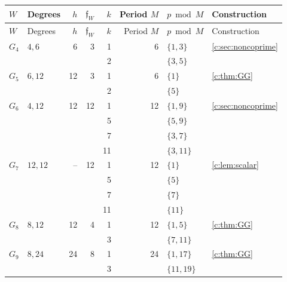 \documentclass[11pt]{amsart}
\theoremstyle{definition}
\begin{document}
\clearpage
\begingroup\small%
\begingroup\setlength{\tabcolsep}{3pt}
\begin{longtable}{@{}lL{.24\textwidth}rrrrL{.26\textwidth}L{.14\textwidth}@{}}
\toprule $W$ & Degrees & $h$ & $\mathfrak f_W$ & $k$ & Period $M$ & $p\bmod M$ & Construction\\\midrule
\endfirsthead
\toprule $W$ & Degrees & $h$ & $\mathfrak f_W$ & $k$ & Period $M$ & $p\bmod M$ & Construction\\\midrule
\endhead
\bottomrule\endfoot
\endlastfoot
$G_{4}$ & $4,\allowbreak 6$ & 6 & 3 & 1 & 6 & $\{1,\allowbreak 3\}$ & \cref{c:sec:noncoprime} \\*
 &  &  &  & 2 &  & $\{3,\allowbreak 5\}$ &  \\
\midrule[.25pt]
$G_{5}$ & $6,\allowbreak 12$ & 12 & 3 & 1 & 6 & $\{1\}$ & \cref{c:thm:GG} \\*
 &  &  &  & 2 &  & $\{5\}$ &  \\
\midrule[.25pt]
$G_{6}$ & $4,\allowbreak 12$ & 12 & 12 & 1 & 12 & $\{1,\allowbreak 9\}$ & \cref{c:sec:noncoprime} \\*
 &  &  &  & 5 &  & $\{5,\allowbreak 9\}$ &  \\*
 &  &  &  & 7 &  & $\{3,\allowbreak 7\}$ &  \\*
 &  &  &  & 11 &  & $\{3,\allowbreak 11\}$ &  \\
\midrule[.25pt]
$G_{7}$ & $12,\allowbreak 12$ & -- & 12 & 1 & 12 & $\{1\}$ & \cref{c:lem:scalar} \\*
 &  &  &  & 5 &  & $\{5\}$ &  \\*
 &  &  &  & 7 &  & $\{7\}$ &  \\*
 &  &  &  & 11 &  & $\{11\}$ &  \\
\midrule[.25pt]
$G_{8}$ & $8,\allowbreak 12$ & 12 & 4 & 1 & 12 & $\{1,\allowbreak 5\}$ & \cref{c:thm:GG} \\*
 &  &  &  & 3 &  & $\{7,\allowbreak 11\}$ &  \\
\midrule[.25pt]
$G_{9}$ & $8,\allowbreak 24$ & 24 & 8 & 1 & 24 & $\{1,\allowbreak 17\}$ & \cref{c:thm:GG} \\*
 &  &  &  & 3 &  & $\{11,\allowbreak 19\}$ &  \\*

\end{longtable}
\end{document}
